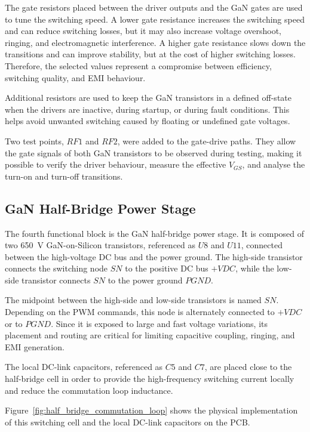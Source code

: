 The gate resistors placed between the driver outputs and the GaN gates are used to tune the switching speed. A lower gate resistance increases the switching speed and can reduce switching losses, but it may also increase voltage overshoot, ringing, and electromagnetic interference. A higher gate resistance slows down the transitions and can improve stability, but at the cost of higher switching losses. Therefore, the selected values represent a compromise between efficiency, switching quality, and EMI behaviour.

Additional resistors are used to keep the GaN transistors in a defined off-state when the drivers are inactive, during startup, or during fault conditions. This helps avoid unwanted switching caused by floating or undefined gate voltages.

Two test points, \(RF1\) and \(RF2\), were added to the gate-drive paths. They allow the gate signals of both GaN transistors to be observed during testing, making it possible to verify the driver behaviour, measure the effective \(V_{GS}\), and analyse the turn-on and turn-off transitions.



\subsection{GaN Half-Bridge Power Stage}

The fourth functional block is the GaN half-bridge power stage. It is composed of two 650~V GaN-on-Silicon transistors, referenced as \(U8\) and \(U11\), connected between the high-voltage DC bus and the power ground. The high-side transistor connects the switching node \(SN\) to the positive DC bus \(+VDC\), while the low-side transistor connects \(SN\) to the power ground \(PGND\).

The midpoint between the high-side and low-side transistors is named \(SN\). Depending on the PWM commands, this node is alternately connected to \(+VDC\) or to \(PGND\). Since it is exposed to large and fast voltage variations, its placement and routing are critical for limiting capacitive coupling, ringing, and EMI generation.

The local DC-link capacitors, referenced as \(C5\) and \(C7\), are placed close to the half-bridge cell in order to provide the high-frequency switching current locally and reduce the commutation loop inductance.

\newpage
Figure~\ref{fig:half_bridge_commutation_loop} shows the physical implementation of this switching cell and the local DC-link capacitors on the PCB.

